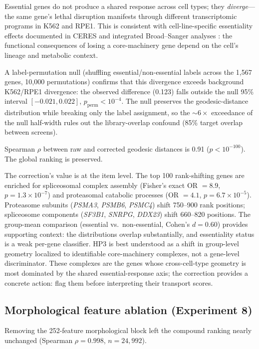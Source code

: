 \documentclass[11pt]{article}
\begin{document}
Essential genes do not produce a shared response across cell types; they
\emph{diverge}---the same gene's lethal disruption manifests through
different transcriptomic programs in K562 and RPE1. This is consistent with cell-line-specific
essentiality effects documented in CERES \citep{meyers2017ceres} and
integrated Broad--Sanger analyses \citep{pacini2021integrated}: the
functional consequences of losing a core-machinery gene depend on
the cell's lineage and metabolic context.

A label-permutation null (shuffling essential/non-essential labels across
the 1{,}567 genes, 10{,}000 permutations) confirms that this divergence
exceeds background K562/RPE1 divergence: the observed difference (0.123)
falls outside the null 95\% interval $[-0.021, 0.022]$,
$p_{\text{perm}} < 10^{-4}$. The null preserves the geodesic-distance
distribution while breaking only the label assignment, so the ${\sim}6\times$
exceedance of the null half-width rules out the library-overlap confound
(85\% target overlap between screens).

Spearman $\rho$ between raw and corrected geodesic distances is 0.91
($p < 10^{-100}$). The global ranking is preserved.

The correction's value is at the item level. The top 100 rank-shifting
genes are enriched for spliceosomal complex assembly (Fisher's exact
OR $= 8.9$, $p = 1.3 \times 10^{-7}$) and proteasomal catabolic
processes (OR $= 4.1$, $p = 6.7 \times 10^{-5}$). Proteasome subunits
(\emph{PSMA3}, \emph{PSMB6}, \emph{PSMC4}) shift 750--900 rank positions;
spliceosome components (\emph{SF3B1}, \emph{SNRPG}, \emph{DDX23}) shift
660--820 positions. The group-mean comparison (essential vs.\ non-essential,
Cohen's $d = 0.60$) provides supporting context: the distributions overlap
substantially, and essentiality status is a weak per-gene classifier.
HP3 is best understood as a shift in group-level geometry localized to
identifiable core-machinery complexes, not a gene-level discriminator.
These complexes are the genes whose cross-cell-type geometry is most
dominated by the shared essential-response axis; the correction provides a
concrete action: flag them before interpreting their transport scores.

\subsection{Morphological feature ablation (Experiment 8)}

Removing the 252-feature morphological block left the compound ranking nearly
unchanged (Spearman $\rho = 0.998$, $n = 24{,}992$).
\end{document}

